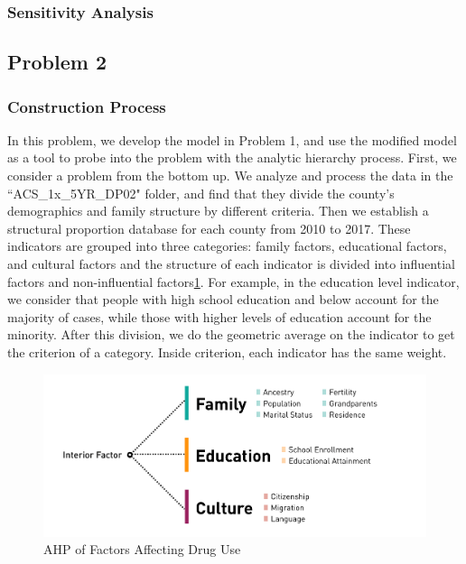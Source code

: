 \documentclass{mcmthesis}
\begin{document}
\subsubsection{Sensitivity Analysis}

\subsection{Problem 2}
\subsubsection{Construction Process}
In this problem, we develop the model in Problem 1, and use the modified model as a tool to probe into the problem with the analytic hierarchy process. First, we consider a problem from the bottom up. We analyze and process the data in the ``ACS\_1x\_5YR\_DP02" folder, and find that they divide the county's demographics and family structure by different criteria. Then we establish a structural proportion database for each county from 2010 to 2017. These indicators are grouped into three categories: family factors, educational factors, and cultural factors and the structure of each indicator is divided into influential factors and non-influential factors\ref{model2_layer}. For example, in the education level indicator, we consider that people with high school education and below account for the majority of cases, while those with higher levels of education account for the minority. After this division, we do the geometric average on the indicator to get the criterion of a category. Inside criterion, each indicator has the same weight.
\begin{figure}[h]
	\centering
	\includegraphics[width=15cm]{model2_layer.png}
	\caption{AHP of Factors Affecting Drug Use}\label{model2_layer}
\end{figure}
\end{document}
